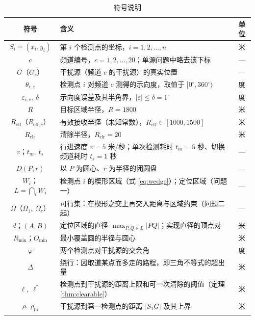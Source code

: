 \documentclass[withoutpreface, bwprint]{cumcmthesis}
\newcommand{\symrule}{%
  \arrayrulecolor{black!15}\specialrule{0.3pt}{0.8pt}{0.8pt}\arrayrulecolor{black}}
\begin{document}
\begin{table}[H]
  \centering
  \caption{符号说明}
  \label{tab:symbols}
  \footnotesize
  \begin{tabularx}{\textwidth}{cXc}
    \toprule
    符号 & 含义 & 单位 \\
    \midrule
    $S_i=(x_i,y_i)$ & 第 $i$ 个检测点的坐标，$i=1,2,\ldots,n$ & 米 \\ \symrule
    $c$             & 频道编号，$c=1,2,\ldots,20$；单源问题中略去该下标 & --- \\ \symrule
    $G$（$G_c$） & 干扰源（频道 $c$ 的干扰源）的真实位置 & --- \\ \symrule
    $\theta_{i,c}$  & 检测点 $i$ 对频道 $c$ 测得的示向度，取值于 $[0^\circ,360^\circ)$ & 度 \\ \symrule
    $\varepsilon_{i,c},\ \delta$ & 示向度误差及其半角界，$\lvert\varepsilon\rvert\le\delta=1^\circ$ & 度 \\ \symrule
    $R$ & 目标区域半径，$R=1800$ & 米 \\ \symrule
    $R_{\mathrm{eff}}$（$R_{\mathrm{eff},c}$） & 有效接收半径（未知常数），$R_{\mathrm{eff}}\in[1000,1500]$ & 米 \\ \symrule
    $R_{\mathrm{clr}}$ & 清除半径，$R_{\mathrm{clr}}=20$ & 米 \\ \symrule
    $v$；$t_m,\ t_s$ & 行进速度 $v=5$ 米/秒；单次检测耗时 $t_m=5$ 秒、切换频道耗时 $t_s=1$ 秒 & --- \\ \symrule
    $D(P,r)$        & 以 $P$ 为圆心、$r$ 为半径的闭圆盘 & --- \\ \symrule
    $W_i$；$L=\bigcap_i W_i$ & 检测点 $i$ 的楔形区域（式 \eqref{eq:wedge}）；定位区域（问题一） & --- \\ \symrule
    $\Omega$（$\Omega_1,\ \Omega_c$） & 可行集：在楔形之交上再交入距离与区域约束（问题二起） & --- \\ \symrule
    $d$；$(A,B)$ & 定位区域的直径 $\max_{P,Q\in L}\lvert PQ\rvert$；实现直径的顶点对 & 米 \\ \symrule
    $R_{\min}$；$O_{\min}$ & 最小覆盖圆的半径与圆心 & 米 \\ \symrule
    $\varphi$       & 两个检测点对干扰源的交会角 & 度 \\ \symrule
    $\Delta$        & 绕行：因取道某点而多走的路程，即三角不等式的超出量 & 米 \\ \symrule
    $\ell,\ \ell^{*}$ & 检测点到干扰源的距离上限和可一次清除的阈值（定理 \ref{thm:clearable}） & 米 \\ \symrule
    $\rho,\ \rho_{\mathrm{hi}}$ & 干扰源到第一检测点的距离 $\lvert S_1G\rvert$ 及其上界 & 米 \\ \symrule

\end{tabularx}
\end{table}
\end{document}
